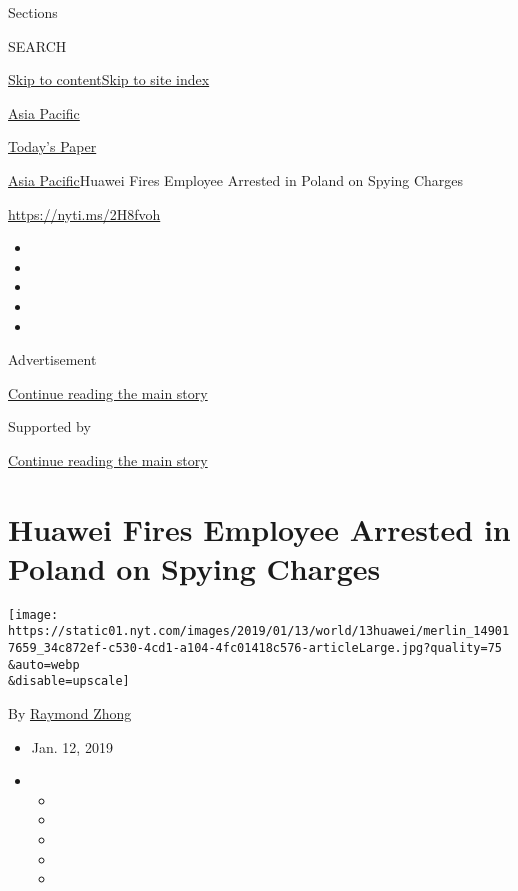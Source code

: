 Sections

SEARCH

\protect\hyperlink{site-content}{Skip to
content}\protect\hyperlink{site-index}{Skip to site index}

\href{https://www.nytimes.com/section/world/asia}{Asia Pacific}

\href{https://myaccount.nytimes.com/auth/login?response_type=cookie\&client_id=vi}{}

\href{https://www.nytimes.com/section/todayspaper}{Today's Paper}

\href{/section/world/asia}{Asia Pacific}\textbar{}Huawei Fires Employee
Arrested in Poland on Spying Charges

\url{https://nyti.ms/2H8fvoh}

\begin{itemize}
\item
\item
\item
\item
\item
\end{itemize}

Advertisement

\protect\hyperlink{after-top}{Continue reading the main story}

Supported by

\protect\hyperlink{after-sponsor}{Continue reading the main story}

\hypertarget{huawei-fires-employee-arrested-in-poland-on-spying-charges}{%
\section{Huawei Fires Employee Arrested in Poland on Spying
Charges}\label{huawei-fires-employee-arrested-in-poland-on-spying-charges}}

\texttt{[image: https://static01.nyt.com/images/2019/01/13/world/13huawei/merlin\_149017659\_34c872ef-c530-4cd1-a104-4fc01418c576-articleLarge.jpg?quality=75\\\&auto=webp\\\&disable=upscale]}

By \href{https://www.nytimes.com/by/raymond-zhong}{Raymond Zhong}

\begin{itemize}
\item
  Jan. 12, 2019
\item
  \begin{itemize}
  \item
  \item
  \item
  \item
  \item
  \end{itemize}
\end{itemize}

